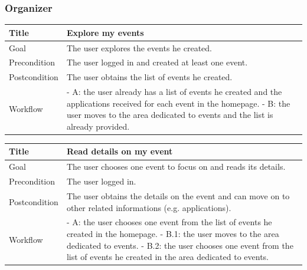 \documentclass{beamer}
\begin{document}
\begin{frame}
    \frametitle{Organizer}
    \begin{table}
        \tiny
        \begin{tabular}{|p{2cm}|p{6cm}|}
        \hline
        Title & \textbf{Explore my events} \\
        \hline
        Goal & The user explores the events he created. \\
        \hline
        Precondition & The user logged in and created at least one event.\\
        \hline
        Postcondition & The user obtains the list of events he created. \\
        \hline
        Workflow &
        - A: the user already has a list of events he created and the applications received for each event 
        in the homepage. \newline
        - B: the user moves to the area dedicated to events and the list is already provided. \\
        \hline
        \end{tabular}
\end{table}

\begin{table}
    \tiny
    \begin{tabular}{|p{2cm}|p{6cm}|}
    \hline
    Title & \textbf{Read details on my event} \\
    \hline
    Goal & The user chooses one event to focus on and reads its details. \\
    \hline
    Precondition & The user logged in. \\
    \hline
    Postcondition & The user obtains the details on the event and 
    can move on to other related informations (e.g. applications). \\
    \hline
    Workflow &
    - A: the user chooses one event from the list of events he created in the homepage. \newline
    - B.1: the user moves to the area dedicated to events. \newline
    - B.2: the user chooses one event from the list of events he created in the area dedicated to events. \\
    \hline
    \end{tabular}
\end{table}

\end{frame}
\end{document}
